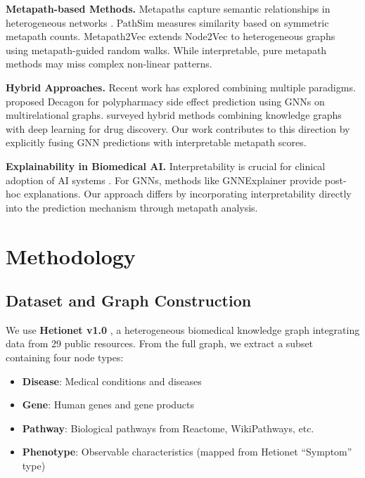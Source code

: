 \documentclass[11pt]{article}
\begin{document}
\textbf{Metapath-based Methods.}
Metapaths capture semantic relationships in heterogeneous networks \citep{sun2011pathsim}. PathSim \citep{sun2011pathsim} measures similarity based on symmetric metapath counts. Metapath2Vec \citep{dong2017metapath2vec} extends Node2Vec to heterogeneous graphs using metapath-guided random walks. While interpretable, pure metapath methods may miss complex non-linear patterns.

\textbf{Hybrid Approaches.}
Recent work has explored combining multiple paradigms. \citet{zitnik2018modeling} proposed Decagon for polypharmacy side effect prediction using GNNs on multirelational graphs. \citet{bonner2022review} surveyed hybrid methods combining knowledge graphs with deep learning for drug discovery. Our work contributes to this direction by explicitly fusing GNN predictions with interpretable metapath scores.

\textbf{Explainability in Biomedical AI.}
Interpretability is crucial for clinical adoption of AI systems \citep{rudin2019stop}. For GNNs, methods like GNNExplainer \citep{ying2019gnnexplainer} provide post-hoc explanations. Our approach differs by incorporating interpretability directly into the prediction mechanism through metapath analysis.

\section{Methodology}
\label{sec:method}

\subsection{Dataset and Graph Construction}
\label{sec:data}

We use \textbf{Hetionet v1.0} \citep{himmelstein2017systematic}, a heterogeneous biomedical knowledge graph integrating data from 29 public resources. From the full graph, we extract a subset containing four node types:
\begin{itemize}
    \item \textbf{Disease}: Medical conditions and diseases
    \item \textbf{Gene}: Human genes and gene products
    \item \textbf{Pathway}: Biological pathways from Reactome, WikiPathways, etc.
    \item \textbf{Phenotype}: Observable characteristics (mapped from Hetionet ``Symptom'' type)
\end{itemize}
\end{document}
